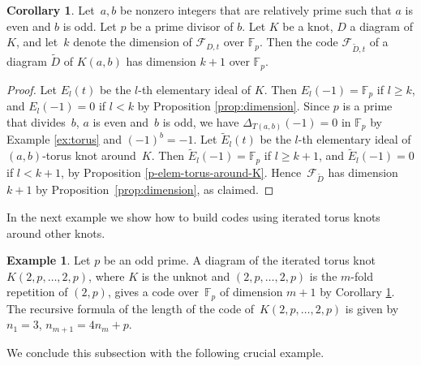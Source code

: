 \documentclass[11pt,a4paper]{article}
\theoremstyle{definition}
\newtheorem{corollary}[theorem]{Corollary}
\newtheorem{example}[theorem]{Example}
\newcommand{\numberset}{\mathbb}
\newcommand{\F}{\numberset{F}}
\newcommand{\mF}{\mathcal{F}}
\begin{document}
\begin{corollary}\label{c-dim-torus-around-K}
Let~$a,b$ be nonzero integers that are relatively prime such that $a$ is even and $b$ is odd. Let $p$ be a prime divisor of $b$.
Let $K$ be a knot, $D$ a diagram of $K$, and let~$k$ denote the dimension of $\mF_{D,t}$ over $\F_p$.
Then the code $\mF_{\tilde{D},t}$ of a diagram $\tilde{D}$ of $K(a, b)$ has dimension $k + 1$ over $\F_p$.
\end{corollary}
\begin{proof}
Let $E_l(t)$ be the $l$-th elementary ideal of $K$. Then  $E_l(-1)=\F_p$ if $l\geq k$, and $E_l(-1)=0$ if $l<k$ by Proposition \ref{prop:dimension}.
Since $p$ is a prime that divides~$b$, $a$ is even and~$b$ is odd, we have $\Delta_{T(a,b)}(-1)=0$ in $\F_p$ by Example \ref{ex:torus} and $(-1)^b=-1$.
Let $\tilde{E}_l(t)$ be the $l$-th elementary ideal of $(a,b)$-torus knot around~$K$.
Then  $\tilde{E}_l(-1)=\F_p$ if $l\geq k+1$, and $\tilde{E}_l(-1)=0$ if $l<k+1$, by Proposition \ref{p-elem-torus-around-K}.
Hence~$\mF_{\tilde{D}}$ has dimension $k+1$ by Proposition~\ref{prop:dimension}, as claimed.
\end{proof}


In the next example we show how to build codes using 
iterated torus knots around other knots.

\begin{example}
Let $p$ be an odd prime. A diagram of the iterated torus knot $K(2,p,\ldots ,2,p)$, where $K$ is the unknot and $(2,p,\ldots ,2,p)$ is the $m$-fold
repetition of $(2,p)$, gives a code over~$\F_p$ of dimension $m+1$ by Corollary \ref{c-dim-torus-around-K}. 
The recursive formula of the length of the code of~$K(2,p,\ldots ,2,p)$ is given by $n_1=3$, $n_{m+1} =4n_m+p$.
\end{example}

We conclude this subsection with the following crucial example.
\end{document}
